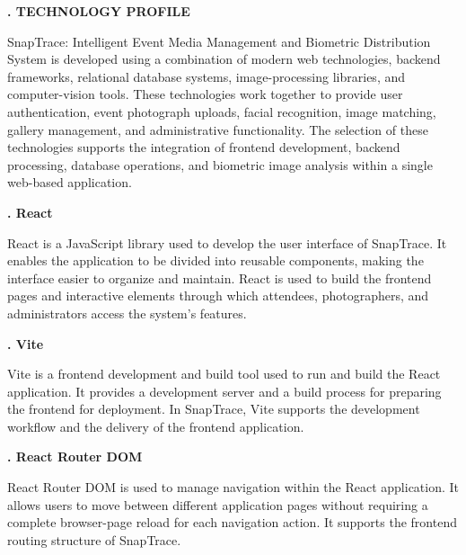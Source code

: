 \vspace*{0.5cm}
{ \noindent \bfseries \fontsize{14pt}{15pt}. TECHNOLOGY PROFILE
    \par}
\vspace{0.4cm}

\par \noindent SnapTrace: Intelligent Event Media Management and Biometric Distribution System is developed using a combination of modern web technologies, backend frameworks, relational database systems, image-processing libraries, and computer-vision tools. These technologies work together to provide user authentication, event photograph uploads, facial recognition, image matching, gallery management, and administrative functionality. The selection of these technologies supports the integration of frontend development, backend processing, database operations, and biometric image analysis within a single web-based application.


\vspace{0.4cm}
{ \noindent \bfseries \fontsize{14pt}{15pt}. React
}
\vspace{0.2cm}
\par \noindent React is a JavaScript library used to develop the user interface of SnapTrace. It enables the application to be divided into reusable components, making the interface easier to organize and maintain. React is used to build the frontend pages and interactive elements through which attendees, photographers, and administrators access the system's features.

\vspace{0.4cm}
{ \noindent \bfseries \fontsize{14pt}{15pt}. Vite
}
\vspace{0.2cm}
\par \noindent Vite is a frontend development and build tool used to run and build the React application. It provides a development server and a build process for preparing the frontend for deployment. In SnapTrace, Vite supports the development workflow and the delivery of the frontend application.

\vspace{0.4cm}
{ \noindent \bfseries \fontsize{14pt}{15pt}. React Router DOM
}
\vspace{0.2cm}
\par \noindent React Router DOM is used to manage navigation within the React application. It allows users to move between different application pages without requiring a complete browser-page reload for each navigation action. It supports the frontend routing structure of SnapTrace.

